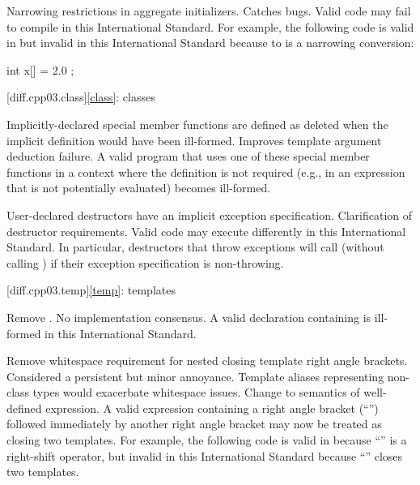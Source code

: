 \change
Narrowing restrictions in aggregate initializers.
\rationale
Catches bugs.
\effect
Valid \CppIII{} code may fail to compile in this International Standard. For
example, the following code is valid in \CppIII{} but invalid in this
International Standard because  to  is a narrowing
conversion:
\begin{codeblock}
int x[] = { 2.0 };
\end{codeblock}

[diff.cpp03.class]{\ref{class}: classes}

\change
Implicitly-declared special member functions are defined as deleted
when the implicit definition would have been ill-formed.
\rationale
Improves template argument deduction failure.
\effect
A valid \CppIII{} program that uses one of these special member functions in a
context where the definition is not required (e.g., in an expression that is
not potentially evaluated) becomes ill-formed.

\change
User-declared destructors have an implicit exception specification.
\rationale
Clarification of destructor requirements.
\effect
Valid \CppIII{} code may execute differently in this International Standard. In
particular, destructors that throw exceptions will call 
(without calling ) if their exception specification is
non-throwing.

[diff.cpp03.temp]{\ref{temp}: templates}

\change
Remove .
\rationale
No implementation consensus.
\effect
A valid \CppIII{} declaration containing  is ill-formed in this
International Standard.

\change
Remove whitespace requirement for nested closing template right angle
brackets.
\rationale
Considered a persistent but minor annoyance. Template aliases
representing non-class types would exacerbate whitespace issues.
\effect
Change to semantics of well-defined expression. A valid \CppIII{} expression
containing a right angle bracket (``\tcode{>}'') followed immediately by
another right angle bracket may now be treated as closing two templates.
For example, the following code is valid in \CppIII{} because ``\tcode{>>}''
is a right-shift operator, but invalid in this International Standard because
``\tcode{>>}'' closes two templates.

